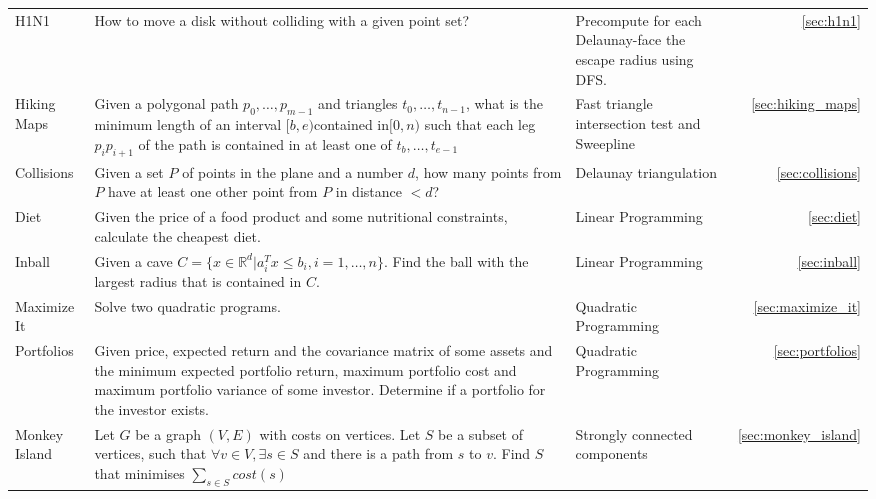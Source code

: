 \documentclass[a4paper, 10pt]{article}
\begin{document}
\begin{longtable}{ L{2cm} L{7cm} L{3cm} r}
        H1N1
        & How to move a disk without colliding with a given point set?
        & Precompute for each Delaunay-face the escape radius using DFS. &  \ref{sec:h1n1} \\

        Hiking Maps 
        & Given a polygonal path $p_0,\dots,p_{m-1}$ and triangles $t_0,\dots,t_{n-1}$, what is the minimum length of 
            an interval $[b,e)$contained in$[0,n)$ such that each leg $p_ip_{i+1}$ of the path is contained in at least one of
                    $t_b,\dots,t_{e-1}$
        & Fast triangle intersection test and Sweepline &  \ref{sec:hiking_maps} \\

        Collisions 
        & Given a set $P$ of points in the plane and a number $d$, 
            how many points from $P$ have at least one other point from $P$ in distance $<d$?        
        & Delaunay triangulation &  \ref{sec:collisions} \\

        Diet 
        & Given the price of a food product and some nutritional constraints, calculate the cheapest diet.
        & Linear Programming &  \ref{sec:diet} \\

        Inball 
        & Given a cave $C=\{x\in \mathbb{R} ^d|a_i^Tx\leq b_i, i=1,\dots,n\}.$ Find the ball with the largest radius that is contained in $C$.
        & Linear Programming &  \ref{sec:inball} \\

        Maximize It
        & Solve two quadratic programs. 
        & Quadratic Programming &  \ref{sec:maximize_it} \\

        Portfolios 
        & Given price, expected return and the covariance matrix of some assets 
            and the minimum expected portfolio return, maximum portfolio cost  and maximum portfolio variance of some investor. 
            Determine if a portfolio for the investor exists.
        & Quadratic Programming &  \ref{sec:portfolios} \\

        Monkey Island 
        & Let $G$ be a graph $(V,E)$ with costs on vertices. Let $S$ be a subset of vertices,
            such that $\forall v\in V,\exists s\in S$ and there is a path from  $s$ to $v$. 
            Find $S$ that minimises $\sum_{s\in S}cost(s)$ 
        & Strongly connected components &  \ref{sec:monkey_island} \\


\end{longtable}
\end{document}
